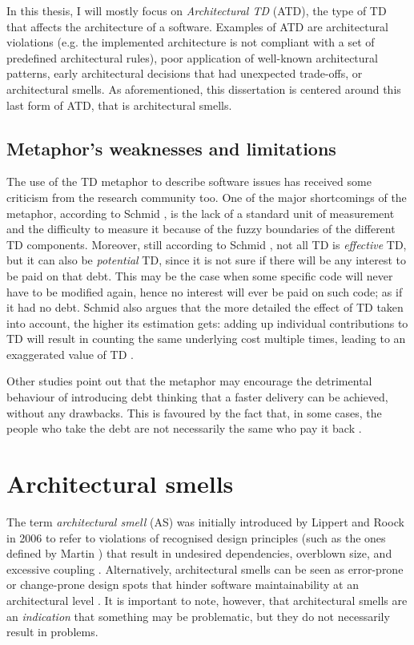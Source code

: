 In this thesis, I will mostly focus on \emph{Architectural TD} (ATD), the type of TD that affects the architecture of a software.
Examples of ATD are architectural violations (e.g. the implemented architecture is not compliant with a set of predefined architectural rules), poor application of well-known architectural patterns, early architectural decisions that had unexpected trade-offs, or architectural smells.
As aforementioned, this dissertation is centered around this last form of ATD, that is architectural smells.

\subsection{Metaphor's weaknesses and limitations}
The use of the TD metaphor to describe software issues has received some criticism from the research community too.
One of the major shortcomings of the metaphor, according to Schmid \cite{Schmid2013}, is the lack of a standard unit of measurement and the difficulty to measure it because of the fuzzy boundaries of the different TD components.
Moreover, still according to Schmid \cite{Schmid2013}, not all TD is \textit{effective} TD, but it can also be \textit{potential} TD, since it is not sure if there will be any interest to be paid on that debt.
This may be the case when some specific code will never have to be modified again, hence no interest will ever be paid on such code; as if it had no debt.
Schmid also argues that the more detailed the effect of TD taken into account, the higher its estimation gets: adding up individual contributions to TD will result in counting the same underlying cost multiple times, leading to an exaggerated value of TD \cite{Schmid2013}.

Other studies point out that the metaphor may encourage the detrimental behaviour of introducing debt thinking that a faster delivery can be achieved, without any drawbacks. This is favoured by the fact that, in some cases, the people who take the debt are not necessarily the same who pay it back \cite{Allman2012}.


\section{Architectural smells}
The term \emph{architectural smell} (AS) was initially introduced by Lippert and Roock in 2006 \cite{Lippert2006} to refer to violations of recognised design principles (such as the ones defined by Martin \cite{Martin2018}) that result in undesired dependencies, overblown size, and excessive coupling \cite{Garcia2009}.
Alternatively, architectural smells can be seen as error-prone or change-prone design spots that hinder software maintainability at an architectural level \cite{Mo2015}.
It is important to note, however, that architectural smells are an \emph{indication} that something may be problematic, but they do not necessarily result in problems.

